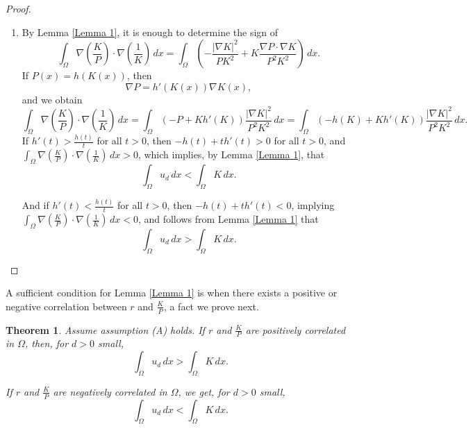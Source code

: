 \documentclass[11pt]{article}
\newcommand{\parentheses}[1]{\left(#1\right)}
\newtheorem{theorem}[statement]{Theorem}
\theoremstyle{definition}
\theoremstyle{remark}
\begin{document}
\begin{proof}
    \begin{enumerate}
        \item By Lemma \ref{Lemma 1}, it is enough to determine the sign of 
        \begin{equation*}
            \int_\Omega \nabla\parentheses{\frac{K}{P}}\cdot\nabla \parentheses{\frac{1}{K}}\,dx=\int_\Omega\parentheses{-\frac{|\nabla K|^2}{PK^2}+K\frac{\nabla P\cdot\nabla K}{P^2K^2}}\,dx.
        \end{equation*}
        If $P(x)=h(K(x))$, then
        \begin{equation*}
            \nabla P=h'(K(x))\nabla K(x),
        \end{equation*}
        and we obtain
        \begin{equation*}
            \int_\Omega \nabla\parentheses{\frac{K}{P}}\cdot\nabla \parentheses{\frac{1}{K}}\,dx=\int_\Omega\parentheses{-P+Kh'(K)}\frac{|\nabla K|^2}{P^2K^2}\,dx=\int_\Omega\parentheses{-h(K)+Kh'(K)}\frac{|\nabla K|^2}{P^2K^2}\,dx.
        \end{equation*}
        If $h'(t)>\frac{h(t)}{t}$ for all $t>0$, then $-h(t)+th'(t)>0$ for all $t>0$, and $\int_\Omega \nabla\parentheses{\frac{K}{P}}\cdot\nabla \parentheses{\frac{1}{K}}\,dx>0$, which implies, by Lemma \ref{Lemma 1}, that
        \begin{equation*}
            \int_\Omega u_d\,dx<\int_\Omega K\,dx.
        \end{equation*}
        
        And if $h'(t)<\frac{h(t)}{t}$ for all $t>0$, then $-h(t)+th'(t)<0$, implying $\int_\Omega \nabla\parentheses{\frac{K}{P}}\cdot\nabla \parentheses{\frac{1}{K}}\,dx<0$, and follows from Lemma \ref{Lemma 1} that
        \begin{equation*}
            \int_\Omega u_d\,dx>\int_\Omega K\,dx.
        \end{equation*}
        
    \end{enumerate}
\end{proof}


A sufficient condition for Lemma \ref{Lemma 1} is when there exists a positive or negative correlation between $r$ and $\frac{K}{P}$, a fact we prove next.

\begin{theorem}\label{thm: correlation r and K/P}
    Assume assumption (A) holds. If $r$ and $\frac{K}{P}$ are positively correlated in $\Omega$, then, for $d>0$ small,
    \begin{equation*}
    	\int_\Omega u_d\,dx>\int_\Omega K\,dx.
    \end{equation*}
    
    If $r$ and $\frac{K}{P}$ are negatively correlated in $\Omega$, we get, for $d>0$ small,
    \begin{equation*}
    	\int_\Omega u_d\,dx<\int_\Omega K\,dx.
    \end{equation*}
     
\end{theorem}
\end{document}
